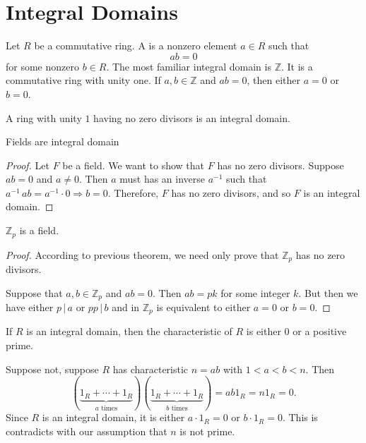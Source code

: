 \section{Integral Domains}

Let $R$ be a commutative ring. A  is a nonzero element $a \in R$ such that 
\begin{equation}
    ab=0
\end{equation}
for some nonzero $b \in R$. The most familiar integral domain is $\mathbb{Z}$. It is a 
commutative ring with unity one. If $a, b \in \mathbb{Z}$ and $ab=0$, then either $a=0$ or 
$b=0$.

\begin{definition}
    A ring with unity $1$ having no zero divisors is an integral domain.
\end{definition}

\begin{lemma}
    Fields are integral domain
\end{lemma}
\begin{proof}
    Let $F$ be a field. We want to show that $F$ has no zero divisors. Suppose $ab =0$ and 
    $a \neq 0$. Then $a$ must has an inverse $a^{-1}$ such that $a^{-1}\, a b = a^{-1} \cdot 0 \Longrightarrow b = 0$.
    Therefore, $F$ has no zero divisors, and so $F$ is an integral domain.
\end{proof}

\begin{corollary}
    $\mathbb{Z}_p$ is a field.
\end{corollary}
\begin{proof}
    According to previous theorem, we need only prove that $\mathbb{Z}_p$ has no zero 
    divisors.

    Suppose that $a, b \in \mathbb{Z}_p$ and $ab = 0$. Then $ab = pk$ for some 
    integer $k$. But then we have either $p \, | \, a$ or $p p \, | \, b$ and in 
    $\mathbb{Z}_p$ is equivalent to either $a = 0$ or $b = 0$.
\end{proof}

\begin{lemma}
    If $R$ is an integral domain, then the characteristic of $R$ is either $0$ or a positive prime.
\end{lemma}
\begin{solution}
    Suppose not, suppose $R$ has characteristic $n=ab$ with $1 < a < b < n$. Then 
    \[
        (\underbrace{1_R + \cdots + 1_R}_{a \text{ times}})(\underbrace{1_R + \cdots + 1_R}_{b \text{ times}}) 
        = ab1_R = n1_R = 0.
    \]
    Since $R$ is an integral domain, it is either $a \cdot 1_R = 0$ or $b \cdot 1_R = 0$. This is contradicts 
    with our assumption that $n$ is not prime.
\end{solution}

